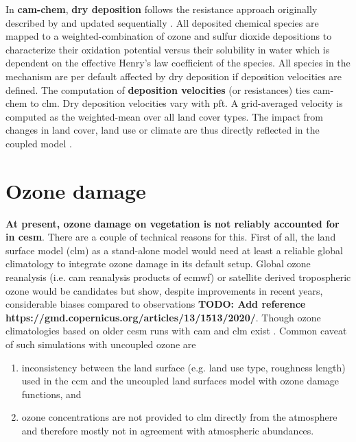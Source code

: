 In \textbf{\gls{cam}-chem}, \textbf{dry deposition} follows the resistance approach originally described by \textcites{AE:Wesely1989}{AE:Walcek1986} and updated sequentially \parencites{AE:Walmsley1996}{AE:Wesely2000}. All deposited chemical species are mapped to a weighted-combination of ozone and sulfur dioxide depositions to characterize their oxidation potential versus their solubility in water which is dependent on the effective Henry’s law coefficient of the species. All species in the mechanism are per default affected by dry deposition if deposition velocities are defined. The computation of \textbf{deposition velocities} (or resistances) ties \gls{cam}-chem to \gls{clm}. Dry deposition velocities vary with \gls{pft}. A grid-averaged velocity is computed as the weighted-mean over all land cover types. The impact from changes in land cover, land use or climate are thus directly reflected in the coupled model \parencite{GMD:Lamarque2012}. 

\section{Ozone damage}
\label{sec:ozone_damage}
\textbf{At present, ozone damage on vegetation is not reliably accounted for in \gls{cesm}}. There are a couple of technical reasons for this. First of all, the land surface model (\gls{clm}) as a stand-alone model would need at least a reliable global climatology to integrate ozone damage in its default setup. Global ozone reanalysis (i.e. \gls{cam} reanalysis products of \gls{ecmwf}) or satellite derived tropospheric ozone would be candidates but show, despite improvements in recent years, considerable biases compared to observations \textbf{TODO: Add reference https://gmd.copernicus.org/articles/13/1513/2020/}. Though ozone climatologies based on older \gls{cesm} runs with \gls{cam} and \gls{clm} exist \parencite{ACP:Lamarque2010}. Common caveat of such simulations with uncoupled ozone are
\begin{enumerate}
\itemsep0pt
\item inconsistency between the land surface (e.g. land use type, roughness length) used in the \gls{ccm} and the uncoupled land surfaces model with ozone damage functions, and
\item ozone concentrations are not provided to \gls{clm} directly from the atmosphere and therefore mostly not in agreement with atmospheric abundances.
\end{enumerate}

